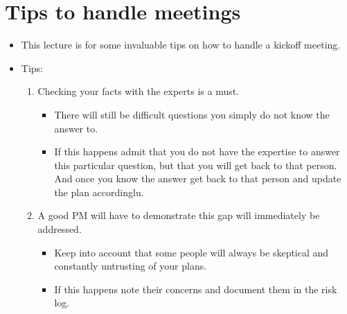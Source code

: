 \section{Tips to handle meetings}
\begin{itemize}
    \item This lecture is for some invaluable tips on how to handle a kickoff meeting.
    \item Tips:
        \begin{enumerate}
            \item Checking your facts with the experts is a must.
                \begin{itemize}
                    \item There will still be difficult questions you simply do not know the answer to.
                    \item If this happens admit that you do not have the expertise to answer this particular question, but that you will get back to that person. And once you know the answer get back to that person and update the plan accordinglu.
                \end{itemize}
                
            \item A good PM will have to demonstrate this gap will immediately be addressed.
                \begin{itemize}
                    \item Keep into account that some people will always be skeptical and constantly untrusting of your plans. 
                    \item If this happens note their concerns and document them in the risk log. 
                \end{itemize}
            

\end{enumerate}
\end{itemize}
